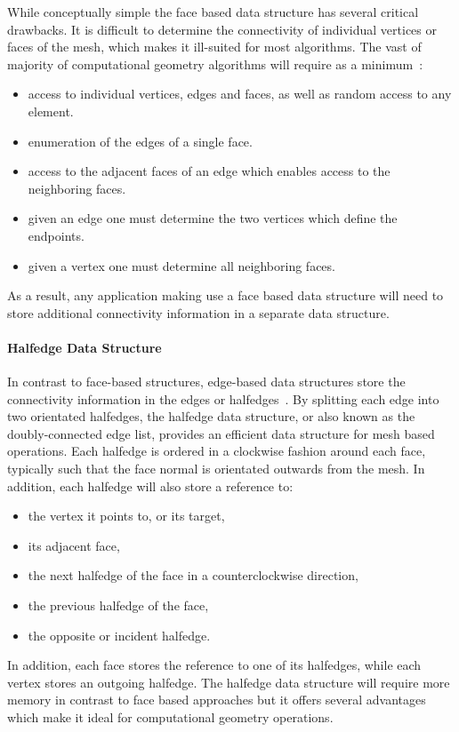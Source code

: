 While conceptually simple the face based data structure has several critical drawbacks.
It is difficult to determine the connectivity of individual vertices or faces of the mesh, which makes it ill-suited for most algorithms.
The vast of majority of computational geometry algorithms will require as a minimum~\cite{botsch2010}:
\begin{itemize}
    \item access to individual vertices, edges and faces, as well as random access to any element.
    \item enumeration of the edges of a single face.
    \item access to the adjacent faces of an edge which enables access to the neighboring faces.
    \item given an edge one must determine the two vertices which define the endpoints.
    \item given a vertex one must determine all neighboring faces.
\end{itemize}
As a result, any application making use a face based data structure will need to store additional connectivity information in a separate data structure.

\paragraph{Halfedge Data Structure}\label{sec:halfedge_data_structure}

In contrast to face-based structures, edge-based data structures store the connectivity information in the edges or halfedges~\cite{botsch2010,orourke1998,berg2008}.
By splitting each edge into two orientated halfedges, the halfedge data structure, or also known as the doubly-connected edge list, provides an efficient data structure for mesh based operations.
Each halfedge is ordered in a clockwise fashion around each face, typically such that the face normal is orientated outwards from the mesh.
In addition, each halfedge will also store a reference to:
\begin{itemize}
    \item the vertex it points to, or its target,
    \item its adjacent face,
    \item the next halfedge of the face in a counterclockwise direction,
    \item the previous halfedge of the face,
    \item the opposite or incident halfedge.
\end{itemize}
In addition, each face stores the reference to one of its halfedges, while each vertex stores an outgoing halfedge. 
The halfedge data structure will require more memory in contrast to face based approaches but it offers several advantages which make it ideal for computational geometry operations.

